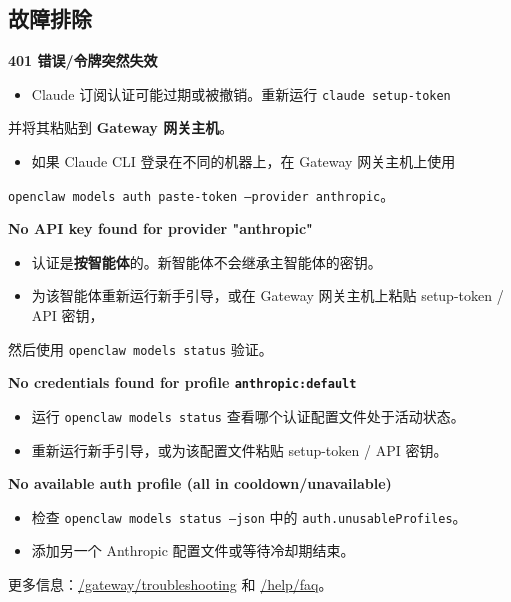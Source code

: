 \subsection{故障排除}


\textbf{401 错误/令牌突然失效}

\begin{itemize}
  \item Claude 订阅认证可能过期或被撤销。重新运行 \texttt{claude setup-token}
\end{itemize}

并将其粘贴到 \textbf{Gateway 网关主机}。
\begin{itemize}
  \item 如果 Claude CLI 登录在不同的机器上，在 Gateway 网关主机上使用
\end{itemize}

\texttt{openclaw models auth paste-token --provider anthropic}。

\textbf{No API key found for provider "anthropic"}

\begin{itemize}
  \item 认证是\textbf{按智能体}的。新智能体不会继承主智能体的密钥。
  \item 为该智能体重新运行新手引导，或在 Gateway 网关主机上粘贴 setup-token / API 密钥，
\end{itemize}

然后使用 \texttt{openclaw models status} 验证。

\textbf{No credentials found for profile \texttt{anthropic:default}}

\begin{itemize}
  \item 运行 \texttt{openclaw models status} 查看哪个认证配置文件处于活动状态。
  \item 重新运行新手引导，或为该配置文件粘贴 setup-token / API 密钥。
\end{itemize}


\textbf{No available auth profile (all in cooldown/unavailable)}

\begin{itemize}
  \item 检查 \texttt{openclaw models status --json} 中的 \texttt{auth.unusableProfiles}。
  \item 添加另一个 Anthropic 配置文件或等待冷却期结束。
\end{itemize}


更多信息：\href{/gateway/troubleshooting}{/gateway/troubleshooting} 和 \href{/help/faq}{/help/faq}。



